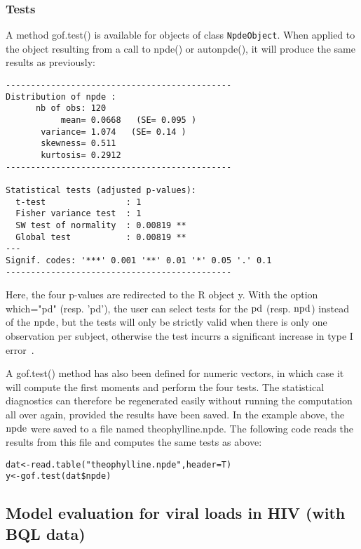\newpage
\subsubsection{Tests}

\hskip 18pt A method {\sf gof.test()} is available for objects of class \texttt{NpdeObject}. When applied to the object resulting from a call to {\sf npde()} or {\sf autonpde()}, it will produce the same results as previously:
\begin{verbatim}
---------------------------------------------
Distribution of npde :
      nb of obs: 120 
           mean= 0.0668   (SE= 0.095 )
       variance= 1.074   (SE= 0.14 )
       skewness= 0.511 
       kurtosis= 0.2912 
---------------------------------------------

Statistical tests (adjusted p-values):
  t-test                : 1
  Fisher variance test  : 1
  SW test of normality  : 0.00819 **
  Global test           : 0.00819 **
---
Signif. codes: '***' 0.001 '**' 0.01 '*' 0.05 '.' 0.1 
---------------------------------------------
\end{verbatim}
Here, the four p-values are redirected to the R object {\sf y}. With the option {\sf which="pd"} (resp. 'pd'), the user can select tests for the ${\rm pd}$ (resp. ${\rm npd}$) instead of the ${\rm npde}$, but the tests will only be strictly valid when there is only one observation per subject, otherwise the test incurrs a significant increase in type I error~\cite{MentrePDE, Brendel06}.

A {\sf gof.test()} method has also been defined for numeric vectors, in which case it will compute the first moments and perform the four tests. The statistical diagnostics can therefore be regenerated easily without running the computation all over again, provided the results have been saved. In the example above, the ${\rm npde}$ were saved to a file named {\sf theophylline.npde}. The following code reads the results from this file and computes the same tests as above:
\begin{verbatim}
dat<-read.table("theophylline.npde",header=T)
y<-gof.test(dat$npde) 
\end{verbatim}


\clearpage

\subsection{Model evaluation for viral loads in HIV (with BQL data)} \label{sec:PDexample}

